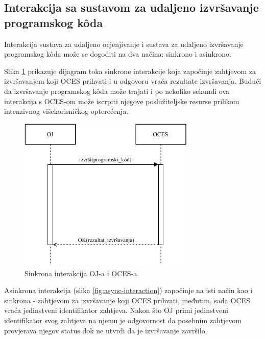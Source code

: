 \documentclass[times, utf8, diplomski]{fer}
\begin{document}
\subsection{Interakcija sa sustavom za udaljeno izvršavanje programskog kôda}
Interakcija sustava za udaljeno ocjenjivanje i sustava za udaljeno izvršavanje programskog kôda može se dogoditi na dva načina: sinkrono i asinkrono.

Slika \ref{fig:sync-interaction} prikazuje dijagram toka sinkrone interakcije koja započinje zahtjevom za izvršavanjem koji OCES prihvati i u odgovoru vraća rezultate izvršavanja. Budući da izvršavanje programskog kôda može trajati i po nekoliko sekundi ova interakcija s OCES-om može iscrpiti njegove poslužiteljske resurse prilikom intenzivnog višekorisničkog opterećenja.

\begin{figure}[htb]
	\centering
	\includegraphics[width=0.75\textwidth]{images/Sync Interakcija.pdf}
	\caption{
		Sinkrona interakcija OJ-a i OCES-a.
	}
	\label{fig:sync-interaction}
\end{figure}

Asinkrona interakcija (slika \ref{fig:async-interaction}) započinje na isti način kao i sinkrona - zahtjevom za izvršavanje koji OCES prihvati, međutim, sada OCES vraća jedinstveni identifikator zahtjeva. Nakon što OJ primi jedinstveni identifikator svog zahtjeva na njemu je odgovornost da posebnim zahtjevom provjerava njegov status dok ne utvrdi da je izvršavanje završilo.
\end{document}
